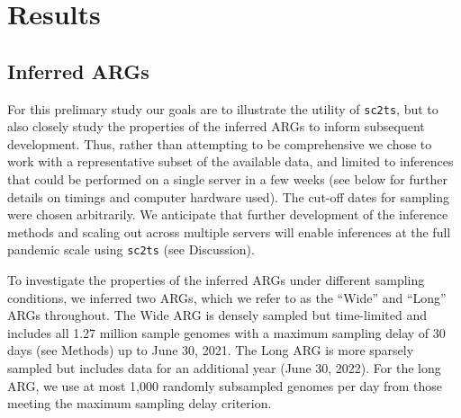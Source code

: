 \documentclass{article}
\begin{document}
\section{Results}
\subsection{Inferred ARGs}
For this prelimary study our goals are to illustrate the utility of
\texttt{sc2ts}, but to also closely study the properties of the
inferred ARGs to inform subsequent development. Thus, rather
than attempting to be comprehensive we chose to work with a
representative subset of the available data, and limited to
inferences that could be performed on a single server in
a few weeks (see below for further details on timings and
computer hardware used). The cut-off dates for sampling were chosen
arbitrarily. We anticipate that further development of the
inference methods and scaling out across multiple servers will
enable inferences at the full pandemic scale using \texttt{sc2ts}
(see Discussion).

To investigate the properties of the inferred ARGs under different
sampling conditions, we inferred two ARGs, which we refer to as the
``Wide'' and ``Long'' ARGs throughout.
The Wide ARG is densely sampled but time-limited and
includes all 1.27 million sample genomes  with a
maximum sampling delay of 30 days (see Methods) up to June 30, 2021.
The Long ARG is more sparsely sampled but
includes data for an additional year (June 30, 2022).
For the long ARG, we use at most 1,000 randomly subsampled
genomes per day from those meeting the maximum sampling delay criterion.
\end{document}
